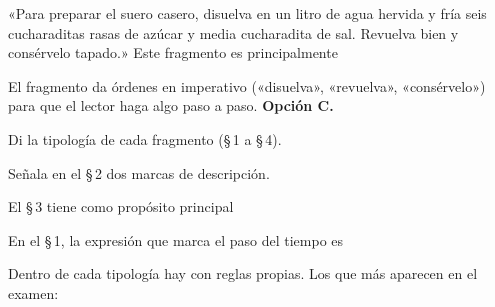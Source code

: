 \begin{reto}
«Para preparar el suero casero, disuelva en un litro de agua hervida y fría seis cucharaditas rasas de azúcar y media
cucharadita de sal. Revuelva bien y consérvelo tapado.» Este fragmento es principalmente
\end{reto}

\begin{retoresuelto}
El fragmento da órdenes en imperativo («disuelva», «revuelva», «consérvelo») para que el lector haga algo paso a paso.
\textbf{Opción C.}
\end{retoresuelto}

\taller
{}
\begin{ejercicios}
\item Di la tipología de cada fragmento (\S\,1 a \S\,4). 
\item Señala en el \S\,2 dos marcas de descripción. 
\end{ejercicios}
\begin{ejercicios}
\item El \S\,3 tiene como propósito principal
\item En el \S\,1, la expresión que marca el paso del tiempo es
\end{ejercicios}

\bitacora


Dentro de cada tipología hay  con reglas propias. Los que más aparecen en el examen:

